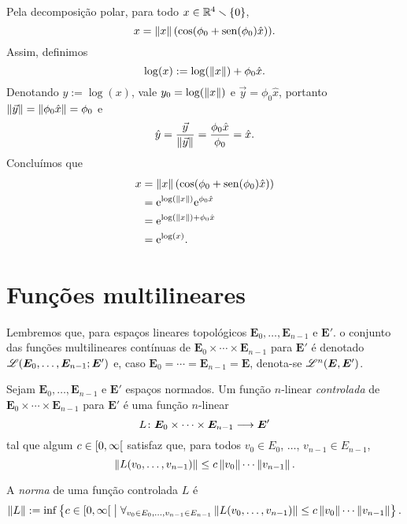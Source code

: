 Pela decomposição polar, para todo $x \in \mathbb{R}^4 \smallsetminus \{0\}$,
	\begin{equation*}
	x = \left\Vert{x}\right\Vert(\cos(\phi_0 + \operatorname{sen}(\phi_0)\hat{x})).
	\end{equation*}
Assim, definimos
	\begin{equation*}
	\log(x) := \log(\left\Vert{x}\right\Vert) + \phi_0 \hat{x}.
	\end{equation*}
Denotando $y := \log(x)$, vale ${y}_0 = \log(\left\Vert{x}\right\Vert)$ e $\vec{y}=\phi_0 \hat{x}$, portanto $\left\Vert{\vec{y}}\right\Vert = \left\Vert{\phi_0\hat{x}}\right\Vert = \phi_0$ e
	\begin{equation*}
	\hat{y} = \frac{\vec{y}}{\left\Vert{\vec{y}}\right\Vert} = \frac{\phi_0 \hat{x}}{\phi_0} = \hat{x}.
	\end{equation*}
Concluímos que
	\begin{align*}
	x &= \left\Vert{x}\right\Vert(\cos(\phi_0 + \operatorname{sen}(\phi_0)\hat{x})) \\
		&= \mathrm{e}^{\log(\left\Vert{x}\right\Vert)}\mathrm{e}^{\phi_0 \hat{x}} \\
		&= \mathrm{e}^{\log(\left\Vert{x}\right\Vert) + \phi_0 \hat{x}} \\
		&= \mathrm{e}^{\log(x)}.
	\end{align*}






\section{Funções multilineares}

Lembremos que, para espaços lineares topológicos $\bm E_0,\dots,\bm E_{n-1}$ e $\bm E'$. o conjunto das funções multilineares contínuas de $\bm E_0 \times \cdots \times \bm E_{n-1}$ para $\bm E'$ é denotado $\mathscr{L}(\bm E_0, \ldots, \bm E_{n-1}; \bm E')$ e, caso $\bm E_0 = \cdots = \bm E_{n-1} = \bm E$, denota-se $\mathscr{L}^n(\bm E, \bm E')$.

\begin{definition}
Sejam $\bm E_0,\dots,\bm E_{n-1}$ e $\bm E'$ espaços normados. Um função $n$-linear \emph{controlada} de $\bm E_0 \times \cdots \times \bm E_{n-1}$ para $\bm E'$ é uma função $n$-linear
	\begin{equation*}
	L\colon \allowbreak \bm E_0 \times \cdots \times \bm E_{n-1} \longrightarrow \bm E'
	\end{equation*}
tal que algum $c \in \left[0,\allowbreak \infty\right[$ satisfaz que, para todos $v_0 \in E_0$, $\ldots$, $v_{n-1} \in E_{n-1}$,
	\begin{equation*}
	\left\Vert{L(v_0,\dots,v_{n-1})}\right\Vert \leq c\left\Vert{v_0}\right\Vert\cdots\left\Vert{v_{n-1}}\right\Vert.
	\end{equation*}

A \emph{norma} de uma função controlada $L$ é
	\begin{equation*}
	\left\Vert{L}\right\Vert := \inf\left\{ c \in \left[0,\allowbreak \infty\right[ \;\middle\vert\; \forall_{v_0 \in E_0, \ldots, v_{n-1} \in E_{n-1}} \left\Vert{L(v_0,\dots,v_{n-1})}\right\Vert \leq c\left\Vert{v_0}\right\Vert\cdots\left\Vert{v_{n-1}}\right\Vert \right\}.
	\end{equation*}
\end{definition}

